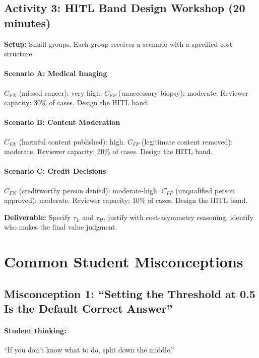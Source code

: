 \subsection{Activity 3: HITL Band Design Workshop (20 minutes)}

\textbf{Setup:} Small groups. Each group receives a scenario with a specified cost structure.

\paragraph{Scenario A: Medical Imaging}
$C_{FN}$ (missed cancer): very high. $C_{FP}$ (unnecessary biopsy): moderate. Reviewer capacity: 30\% of cases. Design the HITL band.

\paragraph{Scenario B: Content Moderation}
$C_{FN}$ (harmful content published): high. $C_{FP}$ (legitimate content removed): moderate. Reviewer capacity: 20\% of cases. Design the HITL band.

\paragraph{Scenario C: Credit Decisions}
$C_{FN}$ (creditworthy person denied): moderate-high. $C_{FP}$ (unqualified person approved): moderate. Reviewer capacity: 10\% of cases. Design the HITL band.

\textbf{Deliverable:} Specify $\tau_L$ and $\tau_H$, justify with cost-asymmetry reasoning, identify who makes the final value judgment.

\section{Common Student Misconceptions}

\subsection{Misconception 1: ``Setting the Threshold at 0.5 Is the Default Correct Answer''}

\paragraph{Student thinking:} ``If you don't know what to do, split down the middle.''

